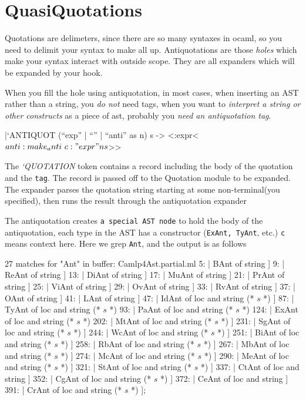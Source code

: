\section{QuasiQuotations}

Quotations are delimeters, since there are so many syntaxes in ocaml,
so you need to delimit your syntax to make all up. Antiquotations are
those \textit{holes} which make your syntax interact with outside
scope. They are all expanders which will be expanded by your hook.

When you fill the hole using antiquotation, in most cases, when
inserting an AST rather than a string, you \textit{do not} need tags,
when you want to \textit{interpret a string or other constructs} as a
piece of ast, probably you \textit{need an antiquotation tag}.

\begin{ocamlcode}
\end{ocamlcode}

\begin{ocamlcode}
  |`ANTIQUOT (``exp'' | ``'' | ``anti'' as n) s ->
  <:expr< $anti:make_anti ~c:"expr" n s $>>
\end{ocamlcode}

The \textit{`QUOTATION} token contains a record including the body of
the quotation and the \verb|tag|. The record is passed off to the
Quotation module to be expanded. The expander parses the quotation
string starting at some non-terminal(you specified), then runs the
result through the antiquotation expander


The antiquotation creates \verb|a special AST node| to hold the body
of the antiquotation, each type in the AST has a constructor
(\verb|ExAnt, TyAnt|, etc.) \verb|c| means context here.  Here we grep
\verb|Ant|, and the output is as follows

\begin{bashcode}
  27 matches for "Ant" in buffer: Camlp4Ast.partial.ml
      5:    | BAnt of string ]
      9:    | ReAnt of string ]
     13:    | DiAnt of string ]
     17:    | MuAnt of string ]
     21:    | PrAnt of string ]
     25:    | ViAnt of string ]
     29:    | OvAnt of string ]
     33:    | RvAnt of string ]
     37:    | OAnt of string ]
     41:    | LAnt of string ]
     47:    | IdAnt of loc and string (* $s$ *) ]
     87:    | TyAnt of loc and string (* $s$ *)
     93:    | PaAnt of loc and string (* $s$ *)
    124:    | ExAnt of loc and string (* $s$ *)
    202:    | MtAnt of loc and string (* $s$ *) ]
    231:    | SgAnt of loc and string (* $s$ *) ]
    244:    | WcAnt of loc and string (* $s$ *) ]
    251:    | BiAnt of loc and string (* $s$ *) ]
    258:    | RbAnt of loc and string (* $s$ *) ]
    267:    | MbAnt of loc and string (* $s$ *) ]
    274:    | McAnt of loc and string (* $s$ *) ]
    290:    | MeAnt of loc and string (* $s$ *) ]
    321:    | StAnt of loc and string (* $s$ *) ]
    337:    | CtAnt of loc and string ]
    352:    | CgAnt of loc and string (* $s$ *) ]
    372:    | CeAnt of loc and string ]
    391:    | CrAnt of loc and string (* $s$ *) ];
\end{bashcode}

